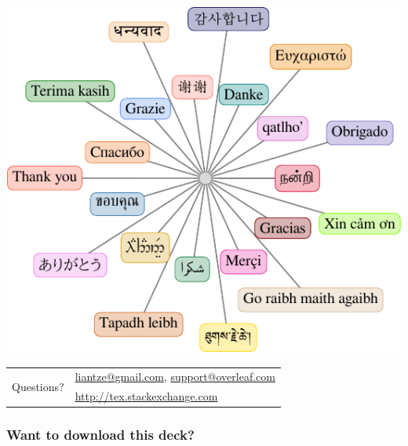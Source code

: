 \documentclass[xcolor={x11names,svgnames,dvipsnames,table}]{beamer}
\begin{document}
\begin{frame}
\centering
\includegraphics[width=.6\textwidth]{multiling-TQ}

\bigskip 
\begin{tabular}{cl}
\multirow{2}{*}{\huge Questions?} & \url{liantze@gmail.com}, \url{support@overleaf.com}\\
& \url{http://tex.stackexchange.com}\\
\end{tabular}

\end{frame}

\begin{frame}
\frametitle{Want to download this deck?}
\centering
{}
\end{frame}
\end{document}
